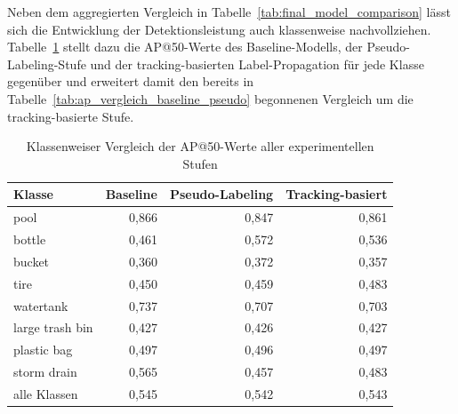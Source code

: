 Neben dem aggregierten Vergleich in Tabelle~\ref{tab:final_model_comparison}
lässt sich die Entwicklung der Detektionsleistung auch klassenweise
nachvollziehen. Tabelle~\ref{tab:ap_vergleich_alle_stufen} stellt dazu die
AP@50-Werte des Baseline-Modells, der Pseudo-Labeling-Stufe und der
tracking-basierten Label-Propagation für jede Klasse gegenüber und erweitert
damit den bereits in Tabelle~\ref{tab:ap_vergleich_baseline_pseudo}
begonnenen Vergleich um die tracking-basierte Stufe.

\begin{table}[H]
    \centering
    \caption{Klassenweiser Vergleich der AP@50-Werte aller experimentellen Stufen}
    \label{tab:ap_vergleich_alle_stufen}
    \begin{tabular}{lrrr}
        \hline
        \textbf{Klasse} & \textbf{Baseline} & \textbf{Pseudo-Labeling} & \textbf{Tracking-basiert} \\
        \hline
        pool            & 0{,}866           & 0{,}847                  & 0{,}861                   \\
        bottle          & 0{,}461           & 0{,}572                  & 0{,}536                   \\
        bucket          & 0{,}360           & 0{,}372                  & 0{,}357                   \\
        tire            & 0{,}450           & 0{,}459                  & 0{,}483                   \\
        watertank       & 0{,}737           & 0{,}707                  & 0{,}703                   \\
        large trash bin & 0{,}427           & 0{,}426                  & 0{,}427                   \\
        plastic bag     & 0{,}497           & 0{,}496                  & 0{,}497                   \\
        storm drain     & 0{,}565           & 0{,}457                  & 0{,}483                   \\
        \hline
        alle Klassen    & 0{,}545           & 0{,}542                  & 0{,}543                   \\
        \hline
    \end{tabular}
\end{table}


